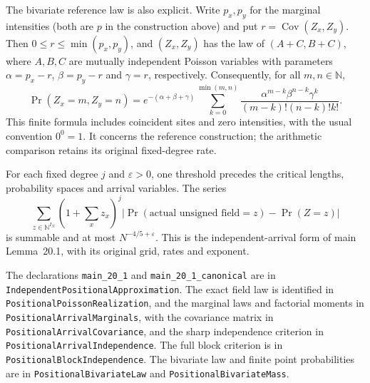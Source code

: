\begin{samepage}
The bivariate reference law is also explicit.  Write $p_x,p_y$ for the
marginal intensities (both are $p$ in the construction above) and put
$r=\operatorname{Cov}(Z_x,Z_y)$.  Then $0\leq r\leq\min(p_x,p_y)$,
and $(Z_x,Z_y)$ has the law of $(A+C,B+C)$, where $A,B,C$ are mutually
independent Poisson variables with parameters
$\alpha=p_x-r$, $\beta=p_y-r$ and $\gamma=r$, respectively.
Consequently, for all $m,n\in\mathbb N$,
\[
 \Pr(Z_x=m,Z_y=n)
 =e^{-(\alpha+\beta+\gamma)}
   \sum_{k=0}^{\min(m,n)}
   \frac{\alpha^{m-k}\beta^{n-k}\gamma^k}{(m-k)!(n-k)!k!}.
\]
This finite formula includes coincident sites and zero intensities, with
the usual convention $0^0=1$.  It concerns the reference construction;
the arithmetic comparison retains its original fixed-degree rate.\par
\end{samepage}

\begin{samepage}
For each fixed degree $j$ and $\varepsilon>0$, one threshold precedes
the critical lengths, probability spaces and arrival variables.  The series
\[
 \sum_{z\in\mathbb N^{I_N}}(1+\textstyle\sum_x z_x)^j
 \bigl|\Pr(\text{actual unsigned field}=z)-\Pr(Z=z)\bigr|
\]
is summable and at most $N^{-4/5+\varepsilon}$.
This is the independent-arrival form of main Lemma~20.1, with its
original grid, rates and exponent.\par
\end{samepage}

\begin{samepage}
The declarations
\texttt{main\_20\_1} and \texttt{main\_20\_1\_canonical} are in
\texttt{Independent\allowbreak{}Positional\allowbreak{}Approximation}.
The exact field law is identified in \texttt{Positional\allowbreak{}Poisson\allowbreak{}Realization},
and the marginal laws and factorial moments in
\texttt{Positional\allowbreak{}Arrival\allowbreak{}Marginals}, with the
covariance matrix in
\texttt{Positional\allowbreak{}Arrival\allowbreak{}Covariance}, and the sharp
independence criterion in
\texttt{Positional\allowbreak{}Arrival\allowbreak{}Independence}.
The full block criterion is in
\texttt{Positional\allowbreak{}Block\allowbreak{}Independence}.
The bivariate law and finite point probabilities are in
\texttt{Positional\allowbreak{}Bivariate\allowbreak{}Law} and
\texttt{Positional\allowbreak{}Bivariate\allowbreak{}Mass}.\par
\end{samepage}

